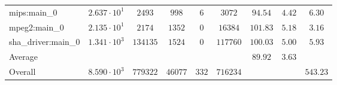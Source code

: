 \begin{tabular}{|l|c|c|c|c|c|c|c|c|}
mips:main\_0            & $ 2.637 \cdot 10^{1} $ & $ 2493   $ & $ 998   $ & $ 6   $ & $ 3072   $ & $ 94.54       $ & $ 4.42    $ & $ 6.30    $ \\
mpeg2:main\_0           & $ 2.135 \cdot 10^{1} $ & $ 2174   $ & $ 1352  $ & $ 0   $ & $ 16384  $ & $ 101.83      $ & $ 5.18    $ & $ 3.16    $ \\
sha\_driver:main\_0     & $ 1.341 \cdot 10^{3} $ & $ 134135 $ & $ 1524  $ & $ 0   $ & $ 117760 $ & $ 100.03      $ & $ 5.00    $ & $ 5.93    $ \\
\hline
Average                 & $                    $ & $        $ & $       $ & $     $ & $        $ & $ 89.92       $ & $ 3.63    $ & $         $ \\
\hline
Overall                 & $ 8.590 \cdot 10^{3} $ & $ 779322 $ & $ 46077 $ & $ 332 $ & $ 716234 $ & $             $ & $         $ & $ 543.23  $ \\
\hline
\end{tabular}
